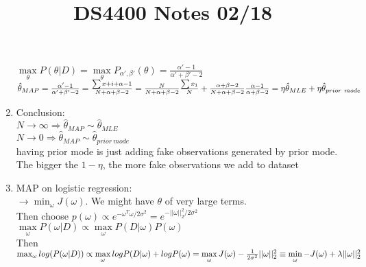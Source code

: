 \documentclass[12pt]{article}
\begin{document}
\begin{enumerate}
                $\max\limits_\theta P(\theta | D) = \max\limits_\theta P_{\alpha', \beta'}(\theta) = \frac{\alpha' - 1}{\alpha' + \beta' -2}$\\
                $\hat{\theta}_{MAP} = \frac{\alpha' - 1}{\alpha' + \beta' -2} = \frac{\sum x+i + \alpha - 1}{N + \alpha + \beta -2}\\
                = \frac{N}{N + \alpha + \beta -2}\frac{\sum x_1}{N} + \frac{\alpha + \beta - 2}{N + \alpha + \beta - 2}\frac{\alpha - 1}{\alpha + \beta - 2}\\
                = \eta\hat{\theta}_{MLE} + \eta\hat{\theta}_{prior \ mode}$
            \item Conclusion:\\
            $N \rightarrow \infty \Rightarrow \hat{\theta}_{MAP} \sim \hat{\theta}_{MLE}$\\
            $N \rightarrow 0 \Rightarrow \hat{\theta}_{MAP} \sim \hat{\theta}_{prior \ mode}$\\
            having prior mode is just adding fake observations generated by prior mode. The bigger the $1 - \eta$, the more fake observations we add to dataset

            \item MAP on logistic regression:\\
            $\rightarrow \min_\omega J(\omega)$. We might have $\theta$ of very large terms. \\
            Then choose $p(\omega) \propto e^{-\omega^T\omega / 2\sigma^2} = e^{-||\omega||^2_2/2\sigma^2}$ \\
            $\max\limits_\omega P(\omega | D) \propto \max\limits_\omega P(D | \omega)P(\omega)$\\
            Then $\max_{\omega} log(P(\omega | D)) \propto \max\limits_{\omega}logP(D | \omega) + log P(\omega) \\
            = \max\limits_{\omega}J(\omega) - \frac{1}{2\sigma^2}||\omega||^2_2\\
            \equiv \min\limits_\omega -J(\omega) + \lambda ||\omega||^2_2$
        \end{enumerate}

        \title{DS4400 Notes 02/18}
        \maketitle
\end{document}
